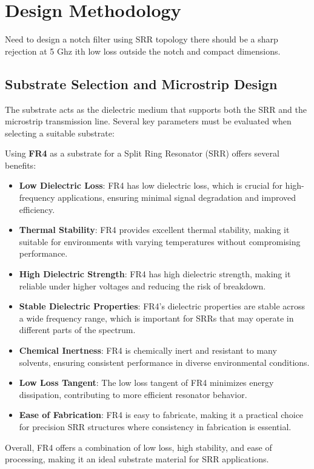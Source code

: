 \documentclass[conference]{IEEEtran}
\begin{document}
\section{Design Methodology}
Need to design a notch filter using SRR topology there should be a sharp rejection at 5 Ghz  ith low loss outside the notch and compact dimensions.

\subsection{Substrate Selection and Microstrip Design}
The substrate acts as the dielectric medium that supports both the SRR and the microstrip transmission line. Several key parameters must be evaluated when selecting a suitable substrate:

Using \textbf{FR4} as a substrate for a Split Ring Resonator (SRR) offers several benefits:

\begin{itemize}
    \item \textbf{Low Dielectric Loss}: FR4 has low dielectric loss, which is crucial for high-frequency applications, ensuring minimal signal degradation and improved efficiency.
    \item \textbf{Thermal Stability}: FR4 provides excellent thermal stability, making it suitable for environments with varying temperatures without compromising performance.
    \item \textbf{High Dielectric Strength}: FR4 has high dielectric strength, making it reliable under higher voltages and reducing the risk of breakdown.
    \item \textbf{Stable Dielectric Properties}: FR4's dielectric properties are stable across a wide frequency range, which is important for SRRs that may operate in different parts of the spectrum.
    \item \textbf{Chemical Inertness}: FR4 is chemically inert and resistant to many solvents, ensuring consistent performance in diverse environmental conditions.
    \item \textbf{Low Loss Tangent}: The low loss tangent of FR4 minimizes energy dissipation, contributing to more efficient resonator behavior.
    \item \textbf{Ease of Fabrication}: FR4 is easy to fabricate, making it a practical choice for precision SRR structures where consistency in fabrication is essential.
\end{itemize}

Overall, FR4 offers a combination of low loss, high stability, and ease of processing, making it an ideal substrate material for SRR applications.
\end{document}
